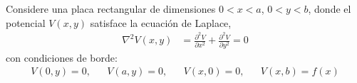 \documentclass[
  11pt,
  letterpaper,
   answers
  ]{exam}
\begin{document}
\begin{questions}
\question \label{rectangular_plate} Considere una placa rectangular de dimensiones $0 < x < a$, $0 < y < b$, donde el potencial $V(x,y)$ satisface la ecuación de Laplace, 
\begin{align}
    \nabla^2 V(x,y) &= \frac{\partial^2 V}{\partial x^2} + \frac{\partial^2 V}{\partial y^2} = 0
\end{align}
con condiciones de borde:
\begin{align}
    V(0,y) = 0, && V(a,y) = 0, && V(x,0) = 0, && V(x,b) = f(x)
\end{align}
\vspace{0.2cm}
\begin{solution}
    \begin{parts}

\end{parts}
\end{solution}
\end{questions}
\end{document}
